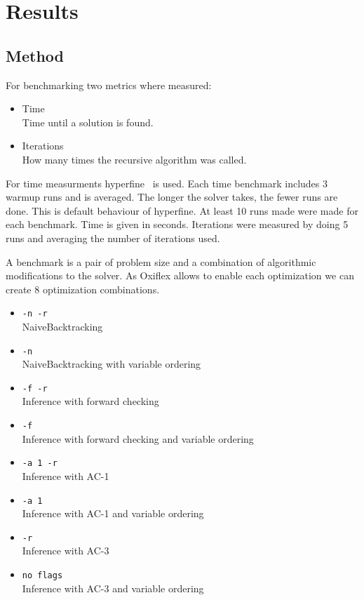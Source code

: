 
\chapter{Results} \label{chap:result}

\section{Method}

For benchmarking two metrics where measured:

\begin{itemize}
	\item Time \\
	      Time until a solution is found.
	\item Iterations \\
	      How many times the recursive algorithm was called.
\end{itemize}

For time measurments hyperfine~\cite{hyperfine:2023} is used. Each time benchmark includes 3 warmup runs and is averaged. The longer the solver takes, the fewer runs are done. This is default behaviour of hyperfine. At least 10 runs made were made for each benchmark. Time is given in seconds. Iterations were measured by doing 5 runs and averaging the number of iterations used.

A benchmark is a pair of problem size and a combination of algorithmic modifications to the solver. As Oxiflex allows to enable each optimization we can create 8 optimization combinations.

\begin{itemize}
	\item \verb|-n -r| \\
	      NaiveBacktracking
	\item \verb|-n| \\
	      NaiveBacktracking with variable ordering
	\item \verb|-f -r| \\
	      Inference with forward checking
	\item \verb|-f| \\
	      Inference with forward checking and variable ordering
	\item \verb|-a 1 -r| \\
	      Inference with AC-1
	\item \verb|-a 1| \\
	      Inference with AC-1 and variable ordering
	\item \verb|-r| \\
	      Inference with AC-3
	\item \verb|no flags| \\
	      Inference with AC-3 and variable ordering
\end{itemize}

